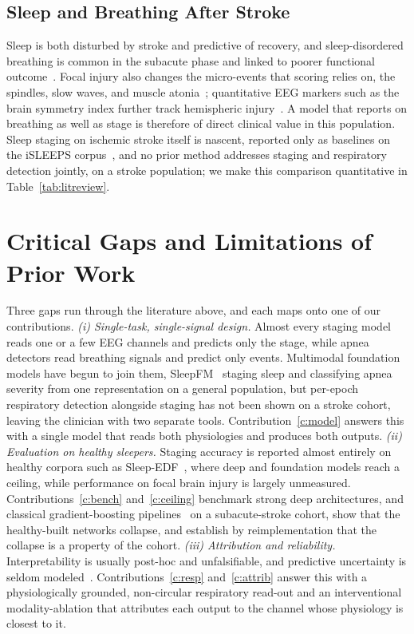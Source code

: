 \documentclass{ieeeaccess}
\begin{document}
\subsection{Sleep and Breathing After Stroke}
Sleep is both disturbed by stroke and predictive of recovery, and sleep-disordered breathing
is common in the subacute phase and linked to poorer functional
outcome~\cite{bassetti2006sleep,denis2024sleep,tellenbach2023brainstem}. Focal injury also changes
the micro-events that scoring relies on, the spindles, slow waves, and muscle
atonia~\cite{gottselig2002stroke,fernandez2019spindles,simpson2023laterality,facchin2020slowwaves,zheng2025spindles};
quantitative EEG markers such as the brain symmetry index further track hemispheric
injury~\cite{anastasi2017bsi}. A model that reports on breathing as well as stage is therefore of
direct clinical value in this population. Sleep staging on ischemic stroke itself is nascent, reported only as baselines on
the iSLEEPS corpus~\cite{maiti2026isleeps}, and no prior method addresses staging and respiratory
detection jointly, on a stroke population; we make this comparison
quantitative in Table~\ref{tab:litreview}.

\section{Critical Gaps and Limitations of Prior Work}
\label{sec:gaps}
Three gaps run through the literature above, and each maps onto one of our contributions.
\emph{(i) Single-task, single-signal design.} Almost every staging model reads one or a few EEG
channels and predicts only the stage, while apnea detectors read breathing signals and predict
only events. Multimodal foundation models have begun to join them, SleepFM~\cite{sleepfm2026}
staging sleep and classifying apnea severity from one representation on a general population,
but per-epoch respiratory detection alongside staging has not been shown on a stroke cohort,
leaving the clinician with two
separate tools. Contribution~\ref{c:model} answers this with a single model that reads both
physiologies and produces both outputs.
\emph{(ii) Evaluation on healthy sleepers.} Staging accuracy is reported almost entirely on
healthy corpora such as Sleep-EDF~\cite{kemp2000sleepedf,goldberger2000physionet}, where deep
and foundation models reach a ceiling, while performance on focal brain injury is largely
unmeasured. Contributions~\ref{c:bench} and~\ref{c:ceiling} benchmark strong deep architectures,
and classical gradient-boosting
pipelines~\cite{chen2016xgboost,ke2017lightgbm,prokhorenkova2018catboost} on a
subacute-stroke cohort, show that the healthy-built networks collapse, and establish by reimplementation that the collapse is a property of the
cohort.
\emph{(iii) Attribution and reliability.} Interpretability is usually post-hoc and
unfalsifiable, and predictive uncertainty is seldom
modeled~\cite{angelopoulos2023conformal}.
Contributions~\ref{c:resp} and~\ref{c:attrib} answer this with a physiologically grounded, non-circular respiratory
read-out and an interventional modality-ablation that attributes each output to the channel whose physiology
is closest to it.
\end{document}
